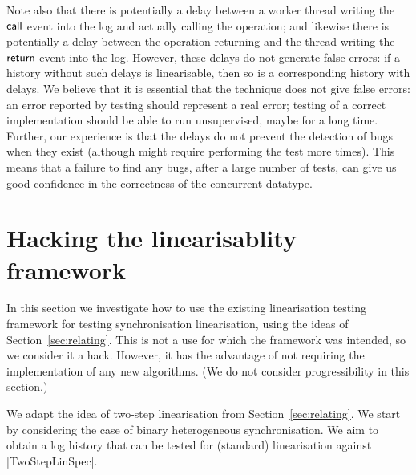 Note also that there is potentially a delay between a worker thread writing the
$\mathsf{call}$ event into the log and actually calling the operation; and likewise
there is potentially a delay between the operation returning and the thread
writing the $\mathsf{return}$ event into the log.  However, these delays do not
generate false errors: if a history without such delays is linearisable, then
so is a corresponding history with delays.  We believe that it is essential
that the technique does not give false errors: an error reported by testing
should represent a real error; testing of a correct implementation should be
able to run unsupervised, maybe for a long time.  Further, our experience is
that the delays do not prevent the detection of bugs when they exist (although
might require performing the test more times).  This means that a failure to
find any bugs, after a large number of tests, can give us good confidence in
the correctness of the concurrent datatype.


\section{Hacking the linearisablity framework}
\label{sec:testing-hacking}

In this section we investigate how to use the existing linearisation testing
framework for testing synchronisation linearisation, using the ideas of
Section~\ref{sec:relating}.  This is not a use for which the framework
was intended, so we consider it a hack.  However, it has the advantage of not
requiring the implementation of any new algorithms.  (We do not consider
progressibility in this section.)


We adapt the idea of two-step linearisation from Section~\ref{sec:relating}.
We start by considering the case of binary heterogeneous synchronisation.  We
aim to obtain a log history that can be tested for (standard) linearisation
against |TwoStepLinSpec|.

